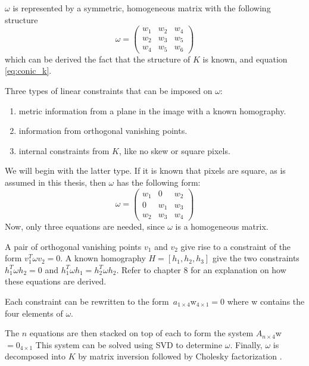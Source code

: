 $\omega$ is represented by a symmetric, homogeneous matrix with the following structure
$$
\omega = \begin{pmatrix}
	w_{1} & w_{2} & w_{4} \\
	w_{2} & w_{3} & w_{5} \\
	w_{4} & w_{5} & w_{6} 
\end{pmatrix}
$$
which can be derived the fact that the structure of $K$ is known, and equation \ref{eq:conic_k}.

Three types of linear constraints that can be imposed on $\omega$:
\begin{enumerate}
	\item metric information from a plane in the image with a known homography.
	\item information from orthogonal vanishing points.
	\item internal constraints from $K$, like no skew or square pixels.
\end{enumerate}

We will begin with the latter type.
If it is known that pixels are square, as is assumed in this thesis, then $\omega$ has the following form:
$$
\omega = \begin{pmatrix}
	w_{1} & 0 & w_{2} \\
	0 & w_{1} & w_{3} \\
	w_{2} & w_{3} & w_{4}
\end{pmatrix}
$$
Now, only three equations are needed, since $\omega$ is a homogeneous matrix.

A pair of orthogonal vanishing points $v_1$ and $v_2$ give rise to a constraint of the form $v_{1}^T \omega v_{2} = 0$.
A known homography $H=[h_{1},h_{2},h_{3}]$ give the two constraints $h_{1}^T \omega h_{2} = 0$ and $h_{1}^T \omega h_{1} = h_{2}^T \omega h_{2}$. Refer to \cite{hartley-zisserman} chapter 8 for an explanation on how these equations are derived.

Each constraint can be rewritten to the form $a_{1 \times 4}$w$_{4 \times 1}=0$ where w contains the four elements of $\omega$.

The $n$ equations are then stacked on top of each to form the system $A_{n \times 4}$w$=0_{4 \times 1}$
This system can be solved using SVD to determine $\omega$.
Finally, $\omega$ is decomposed into $K$ by matrix inversion followed by Cholesky factorization \cite[p. 223-226]{hartley-zisserman}. 

